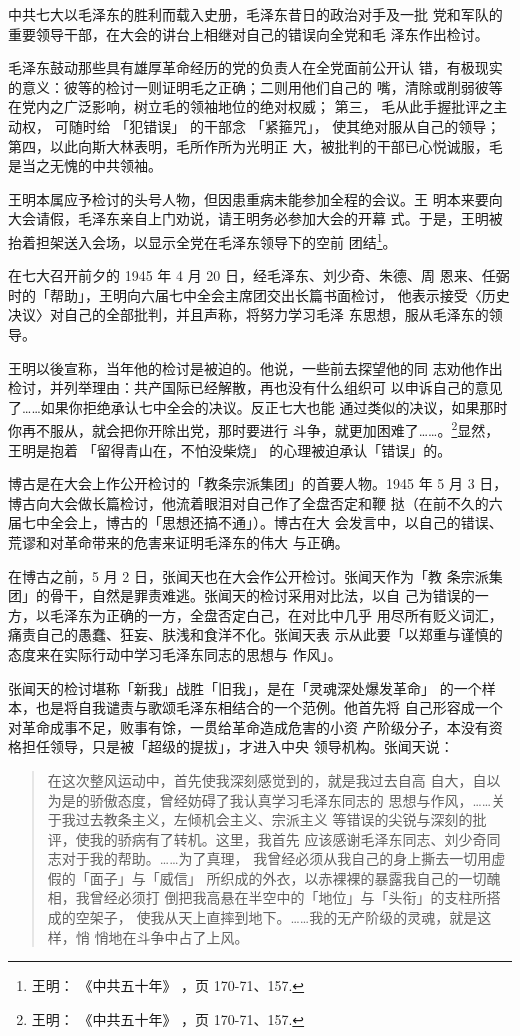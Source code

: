中共七大以毛泽东的胜利而载入史册，毛泽东昔日的政治对手及一批
党和军队的重要领导干部，在大会的讲台上相继对自己的错误向全党和毛
泽东作出检讨。

毛泽东鼓动那些具有雄厚革命经历的党的负责人在全党面前公开认
错，有极现实的意义：彼等的检讨一则证明毛之正确；二则用他们自己的
嘴，清除或削弱彼等在党内之广泛影响，树立毛的领袖地位的绝对权威；
第三，
毛从此手握批评之主动权，
可随时给
「犯错误」
的干部念
「紧箍咒」，
使其绝对服从自己的领导；第四，以此向斯大林表明，毛所作所为光明正
大，被批判的干部已心悦诚服，毛是当之无愧的中共领袖。

王明本属应予检讨的头号人物，但因患重病未能参加全程的会议。王
明本来要向大会请假，毛泽东亲自上门劝说，请王明务必参加大会的开幕
式。于是，王明被抬着担架送入会场，以显示全党在毛泽东领导下的空前
团结\footnote{王明：
《中共五十年》
，页 170-71、157.}。

在七大召开前夕的 1945 年 4 月 20 日，经毛泽东、刘少奇、朱德、周
恩来、任弼时的「帮助」，王明向六届七中全会主席团交出长篇书面检讨，
他表示接受〈历史决议〉对自己的全部批判，并且声称，将努力学习毛泽
东思想，服从毛泽东的领导。

王明以後宣称，当年他的检讨是被迫的。他说，一些前去探望他的同
志劝他作出检讨，并列举理由：共产国际已经解散，再也没有什么组织可
以申诉自己的意见了……如果你拒绝承认七中全会的决议。反正七大也能
通过类似的决议，如果那时你再不服从，就会把你开除出党，那时要进行
斗争，就更加困难了……。\footnote{王明：
《中共五十年》
，页 170-71、157.}显然，
王明是抱着
「留得青山在，不怕没柴烧」
的心理被迫承认「错误」的。

博古是在大会上作公开检讨的「教条宗派集团」的首要人物。1945 年
5 月 3 日，博古向大会做长篇检讨，他流着眼泪对自己作了全盘否定和鞭
挞（在前不久的六届七中全会上，博古的「思想还搞不通」）。博古在大
会发言中，以自己的错误、荒谬和对革命带来的危害来证明毛泽东的伟大
与正确。
 
在博古之前，5 月 2 日，张闻天也在大会作公开检讨。张闻天作为「教
条宗派集团」的骨干，自然是罪责难逃。张闻天的检讨采用对比法，以自
己为错误的一方，以毛泽东为正确的一方，全盘否定白己，在对比中几乎
用尽所有贬义词汇，痛责自己的愚蠢、狂妄、肤浅和食洋不化。张闻天表
示从此要「以郑重与谨慎的态度来在实际行动中学习毛泽东同志的思想与
作风」。
 
张闻天的检讨堪称「新我」战胜「旧我」，是在「灵魂深处爆发革命」
的一个样本，也是将自我谴责与歌颂毛泽东相结合的一个范例。他首先将
自己形容成一个对革命成事不足，败事有馀，一贯给革命造成危害的小资
产阶级分子，本没有资格担任领导，只是被「超级的提拔」，才进入中央
领导机构。张闻天说：
\begin{quote}
	\fzwkai 在这次整风运动中，首先使我深刻感觉到的，就是我过去自高
自大，自以为是的骄傲态度，曾经妨碍了我认真学习毛泽东同志的
思想与作风，……关于我过去教条主义，左倾机会主义、宗派主义
等错误的尖锐与深刻的批评，使我的骄病有了转机。这里，我首先
应该感谢毛泽东同志、刘少奇同志对于我的帮助。……为了真理，
我曾经必须从我自己的身上撕去一切用虚假的「面子」与「威信」
所织成的外衣，以赤裸裸的暴露我自己的一切醜相，我曾经必须打
倒把我高悬在半空中的「地位」与「头衔」的支柱所搭成的空架子，
使我从天上直摔到地下。……我的无产阶级的灵魂，就是这样，悄
悄地在斗争中占了上风。
\end{quote}

